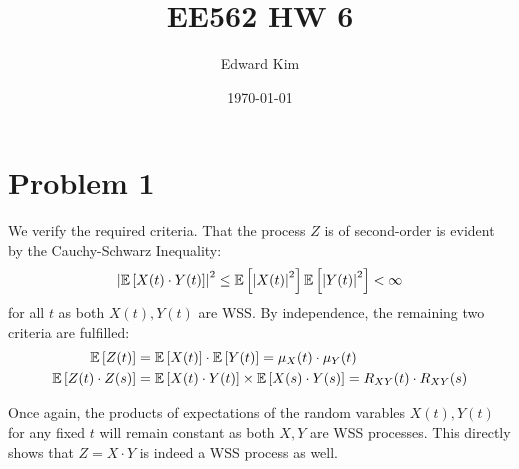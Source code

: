 \documentclass[12pt]{article}%
\title{EE562 HW 6}
\author{Edward Kim}
\date{\today}
\begin{document}
\maketitle

\section{Problem 1}


We verify the required criteria. That the process $Z$ is of second-order is evident by the Cauchy-Schwarz Inequality:
%
\[\abs{\mathbb{E}\left[X(t)\cdot Y(t)\right]}^2 \leq \mathbb{E}\left[\abs
{X(t)}^2\right] \mathbb{E}\left[\abs{Y(t)}^2\right] < \infty \]
for all $t$ as both $X(t),Y(t)$ are WSS. By independence, the remaining two criteria are fulfilled:
%
\begin{align*}
  \mathbb{E}\left[Z(t)\right] & = \mathbb{E}\left[X(t)\right]\cdot\mathbb{E}\left[Y(t)\right] = \mu_{X}(t)\cdot \mu_{Y}(t) \\
  \mathbb{E}\left[Z(t)\cdot Z(s)\right] & = \mathbb{E}\left[X(t)\cdot Y(t)\right]\times \mathbb{E}\left[X(s)\cdot Y(s)\right] = R_{XY}(t)\cdot R_{XY}(s)
\end{align*}

Once again, the products of expectations of the random varables $X(t),Y(t)$ for any fixed $t$ will remain constant as both $X,Y$ are WSS processes. This directly shows that $Z = X \cdot Y$ is indeed a WSS process as well.
\end{document}
